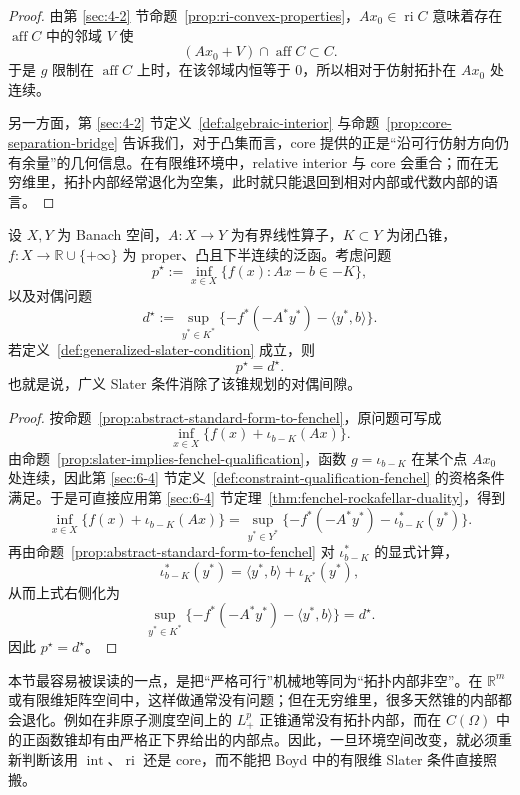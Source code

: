 \begin{proof}
由第 \ref{sec:4-2} 节命题~\ref{prop:ri-convex-properties}，$Ax_0\in \operatorname{ri}C$ 意味着存在 $\operatorname{aff}C$ 中的邻域 $V$ 使
\[
(Ax_0+V)\cap \operatorname{aff}C\subset C.
\]
于是 $g$ 限制在 $\operatorname{aff}C$ 上时，在该邻域内恒等于 $0$，所以相对于仿射拓扑在 $Ax_0$ 处连续。

另一方面，第 \ref{sec:4-2} 节定义~\ref{def:algebraic-interior} 与命题~\ref{prop:core-separation-bridge} 告诉我们，对于凸集而言，core 提供的正是“沿可行仿射方向仍有余量”的几何信息。在有限维环境中，relative interior 与 core 会重合；而在无穷维里，拓扑内部经常退化为空集，此时就只能退回到相对内部或代数内部的语言。
\end{proof}

\begin{theorem}\label{thm:slater-strong-duality-cone}
设 $X,Y$ 为 Banach 空间，$A\colon X\to Y$ 为有界线性算子，$K\subset Y$ 为闭凸锥，$f\colon X\to \mathbb R\cup\{+\infty\}$ 为 proper、凸且下半连续的泛函。考虑问题
\[
p^\star:=\inf_{x\in X}\{f(x):Ax-b\in -K\},
\]
以及对偶问题
\[
d^\star:=\sup_{y^\ast\in K^\ast}\{-f^\ast(-A^\ast y^\ast)-\langle y^\ast,b\rangle\}.
\]
若定义~\ref{def:generalized-slater-condition} 成立，则
\[
p^\star=d^\star.
\]
也就是说，广义 Slater 条件消除了该锥规划的对偶间隙。
\end{theorem}

\begin{proof}
按命题~\ref{prop:abstract-standard-form-to-fenchel}，原问题可写成
\[
\inf_{x\in X}\{f(x)+\iota_{b-K}(Ax)\}.
\]
由命题~\ref{prop:slater-implies-fenchel-qualification}，函数 $g=\iota_{b-K}$ 在某个点 $Ax_0$ 处连续，因此第 \ref{sec:6-4} 节定义~\ref{def:constraint-qualification-fenchel} 的资格条件满足。于是可直接应用第 \ref{sec:6-4} 节定理~\ref{thm:fenchel-rockafellar-duality}，得到
\[
\inf_{x\in X}\{f(x)+\iota_{b-K}(Ax)\}
=
\sup_{y^\ast\in Y^\ast}\{-f^\ast(-A^\ast y^\ast)-\iota_{b-K}^\ast(y^\ast)\}.
\]
再由命题~\ref{prop:abstract-standard-form-to-fenchel} 对 $\iota_{b-K}^\ast$ 的显式计算，
\[
\iota_{b-K}^\ast(y^\ast)=\langle y^\ast,b\rangle+\iota_{K^\ast}(y^\ast),
\]
从而上式右侧化为
\[
\sup_{y^\ast\in K^\ast}\{-f^\ast(-A^\ast y^\ast)-\langle y^\ast,b\rangle\}=d^\star.
\]
因此 $p^\star=d^\star$。
\end{proof}

\begin{remark}\label{remark:interior-vs-core-slater}
本节最容易被误读的一点，是把“严格可行”机械地等同为“拓扑内部非空”。在 $\mathbb R^m$ 或有限维矩阵空间中，这样做通常没有问题；但在无穷维里，很多天然锥的内部都会退化。例如在非原子测度空间上的 $L^p_+$ 正锥通常没有拓扑内部，而在 $C(\Omega)$ 中的正函数锥却有由严格正下界给出的内部点。因此，一旦环境空间改变，就必须重新判断该用 $\operatorname{int}$、$\operatorname{ri}$ 还是 core，而不能把 Boyd 中的有限维 Slater 条件直接照搬。
\end{remark}

